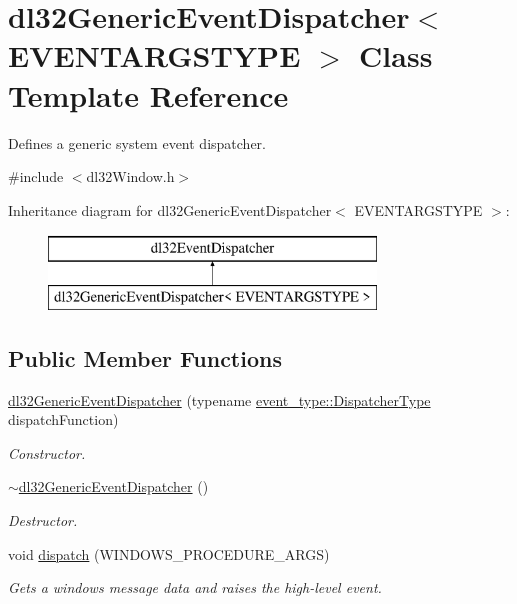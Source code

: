 \hypertarget{classdl32_generic_event_dispatcher}{\section{dl32\-Generic\-Event\-Dispatcher$<$ E\-V\-E\-N\-T\-A\-R\-G\-S\-T\-Y\-P\-E $>$ Class Template Reference}
\label{classdl32_generic_event_dispatcher}
}


Defines a generic system event dispatcher.  




{\ttfamily \#include $<$dl32\-Window.\-h$>$}

Inheritance diagram for dl32\-Generic\-Event\-Dispatcher$<$ E\-V\-E\-N\-T\-A\-R\-G\-S\-T\-Y\-P\-E $>$\-:\begin{figure}[H]
\begin{center}
\leavevmode
\includegraphics[height=2.000000cm]{classdl32_generic_event_dispatcher}
\end{center}
\end{figure}
\subsection*{Public Member Functions}
\begin{DoxyCompactItemize}
\item 
\hyperlink{classdl32_generic_event_dispatcher_a1f5762a2b2deae2fdd0f9f767c0bc9b3}{dl32\-Generic\-Event\-Dispatcher} (typename \hyperlink{classdl32_event_a052c4f4167153ed118fb53ff0e7d43a4}{event\-\_\-type\-::\-Dispatcher\-Type} dispatch\-Function)
\begin{DoxyCompactList}\small\item\em Constructor. \end{DoxyCompactList}\item 
\hyperlink{classdl32_generic_event_dispatcher_a6b57c4ee09514eaa60ef9b902eaa0920}{$\sim$dl32\-Generic\-Event\-Dispatcher} ()
\begin{DoxyCompactList}\small\item\em Destructor. \end{DoxyCompactList}\item 
void \hyperlink{classdl32_generic_event_dispatcher_a9e8caf1dc3f10fba9be7e45fe64525bb}{dispatch} (W\-I\-N\-D\-O\-W\-S\-\_\-\-P\-R\-O\-C\-E\-D\-U\-R\-E\-\_\-\-A\-R\-G\-S)
\begin{DoxyCompactList}\small\item\em Gets a windows message data and raises the high-\/level event. \end{DoxyCompactList}\end{DoxyCompactItemize}
